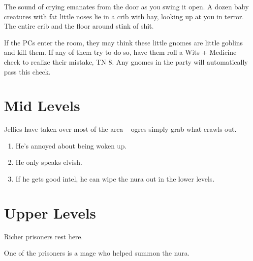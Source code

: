 \begin{multicols}{2}
\begin{exampletext}
\end{exampletext}

\begin{boxtext}

	The sound of crying emanates from the door as you swing it open.
	A dozen baby creatures with fat little noses lie in a crib with hay, looking up at you in terror.
	The entire crib and the floor around stink of shit.

\end{boxtext}

If the PCs enter the room, they may think these little gnomes are little goblins and kill them.
If any of them try to do so, have them roll a Wits + Medicine check to realize their mistake, TN 8.
Any gnomes in the party will automatically pass this check.

\end{multicols}

\section{Mid Levels}

\begin{multicols}{2}


Jellies have taken over most of the area -- ogres simply grab what crawls out.

\jelly

\jelly


\dragon

\begin{enumerate}

	\item{He's annoyed about being woken up.}
	\item{He only speaks elvish.}
	\item{If he gets good intel, he can wipe the nura out in the lower levels.}

\end{enumerate}


\end{multicols}

\section{Upper Levels}

\begin{multicols}{2}


Richer prisoners rest here.

One of the prisoners is a mage who helped summon the nura.

\humandiplomat


\umberhulk

\end{multicols}

